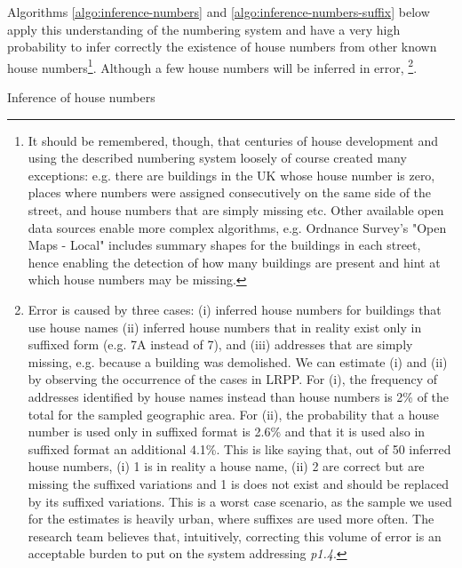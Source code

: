 Algorithms \ref{algo:inference-numbers} and \ref{algo:inference-numbers-suffix} below apply this understanding of the numbering system and have a very high probability to infer correctly the existence of house numbers from other known house numbers\footnote{It should be remembered, though, that centuries of house development and using the described numbering system loosely of course created many exceptions: e.g. there are buildings in the UK whose house number is zero, places where numbers were assigned consecutively on the same side of the street, and house numbers that are simply missing etc. Other available open data sources enable more complex algorithms, e.g. Ordnance Survey's "Open Maps - Local" includes summary shapes for the buildings in each street, hence enabling the detection of how many buildings are present and hint at which house numbers may be missing.}. Although a few house numbers will be inferred in error, \footnote{Error is caused by three cases: (i) inferred house numbers for buildings that use house names (ii) inferred house numbers that in reality exist only in suffixed form (e.g. 7A instead of 7), and (iii) addresses that are simply missing, e.g. because a building was demolished. We can estimate (i) and (ii) by observing the occurrence of the cases in LRPP. For (i), the frequency of addresses identified by house names instead than house numbers is 2\% of the total for the sampled geographic area. For (ii), the probability that a house number is used only in suffixed format is 2.6\% and that it is used also in suffixed format an additional 4.1\%. This is like saying that, out of 50 inferred house numbers, (i) 1 is in reality a house name, (ii) 2 are correct but are missing the suffixed variations and 1 is does not exist and should be replaced by its suffixed variations. This is a worst case scenario, as the sample we used for the estimates is heavily urban, where suffixes are used more often. The research team believes that, intuitively, correcting this volume of error is an acceptable burden to put on the system addressing {\it p1.4}.}.

\vspace{5mm}

\begin{algorithm}[H]
    \caption{Inference of house numbers}
    \label{algo:inference-numbers}
\end{algorithm}

